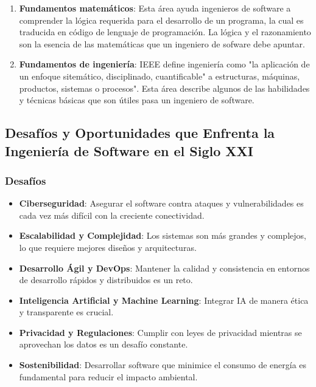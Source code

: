 \documentclass[11pt, a4paper]{article} %
\begin{document}
\begin{enumerate}
        \item \textbf{Fundamentos matemáticos}: Esta área ayuda ingenieros de software a comprender
            la lógica requerida para el desarrollo de un programa, la cual es traducida en
            código de lenguaje de programación. La lógica y el razonamiento son la esencia
            de las matemáticas que un ingeniero de sofware debe apuntar.

        \item \textbf{Fundamentos de ingeniería}: IEEE define ingeniería como "la
            aplicación de un enfoque sitemático, disciplinado, cuantificable" a estructuras,
            máquinas, productos, sistemas o procesos". Esta área describe algunos de las
            habilidades y técnicas básicas que son útiles pasa un ingeniero de software.
    \end{enumerate}

    \subsection{ Desafíos y Oportunidades que Enfrenta la Ingeniería de Software en el Siglo
    XXI }

    \subsubsection{Desafíos}
    \begin{itemize}
        \item \textbf{Ciberseguridad}: Asegurar el software contra ataques y vulnerabilidades
            es cada vez más difícil con la creciente conectividad.

        \item \textbf{Escalabilidad y Complejidad}: Los sistemas son más grandes y complejos,
            lo que requiere mejores diseños y arquitecturas.

        \item \textbf{Desarrollo Ágil y DevOps}: Mantener la calidad y consistencia en entornos
            de desarrollo rápidos y distribuidos es un reto.

        \item \textbf{Inteligencia Artificial y Machine Learning}: Integrar IA de manera ética
            y transparente es crucial.

        \item \textbf{Privacidad y Regulaciones}: Cumplir con leyes de privacidad mientras
            se aprovechan los datos es un desafío constante.

        \item \textbf{Sostenibilidad}: Desarrollar software que minimice el consumo de energía
            es fundamental para reducir el impacto ambiental.
    \end{itemize}
\end{document}
